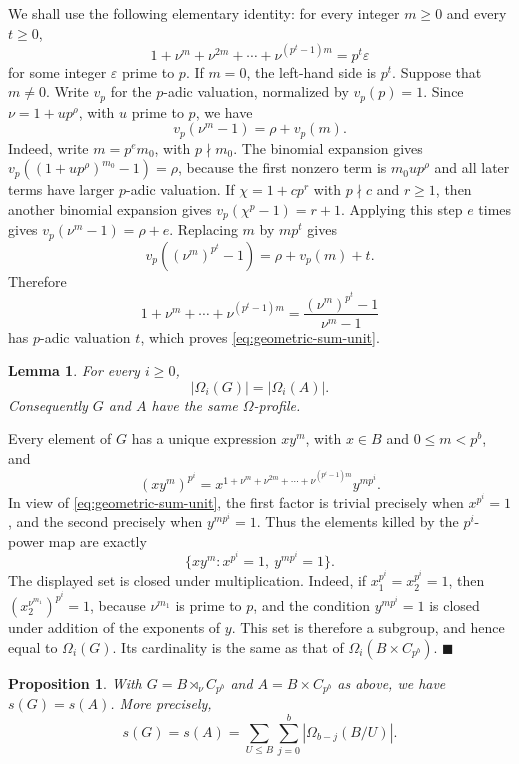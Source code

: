 \documentclass[a4paper,11pt,reqno]{amsart}
\theoremstyle{plain}
\newtheorem{proposition}[theorem]{Proposition}
\newtheorem{lemma}[theorem]{Lemma}
\theoremstyle{remark}
\numberwithin{equation}{section}
\newcommand{\card}[1]{\left\lvert #1\right\rvert}
\renewcommand{\leq}{\leqslant}
\renewcommand{\geq}{\geqslant}
\newenvironment{proofof}{{\bf Proof. }}{\hfill $\blacksquare$ \\}
\begin{document}
We shall use the following elementary identity: for every integer $m\geq 0$
and every $t\geq 0$,
\begin{equation}\label{eq:geometric-sum-unit}
        1+\nu^m+\nu^{2m}+\cdots+\nu^{(p^t-1)m}
        =
        p^t\varepsilon
\end{equation}
for some integer $\varepsilon$ prime to $p$. If $m=0$, the left-hand side is
$p^t$. Suppose that $m\neq 0$. Write $v_p$ for the $p$-adic valuation,
normalized by $v_p(p)=1$. Since $\nu=1+up^\rho$, with $u$ prime to $p$, we have
\[
        v_p(\nu^m-1)=\rho+v_p(m).
\]
Indeed, write $m=p^e m_0$, with $p\nmid m_0$. The binomial expansion gives
$v_p((1+up^\rho)^{m_0}-1)=\rho$, because the first nonzero term is
$m_0up^\rho$ and all later terms have larger $p$-adic valuation. If
$\chi=1+cp^r$ with $p\nmid c$ and $r\geq 1$, then another binomial expansion
gives $v_p(\chi^p-1)=r+1$. Applying this step $e$ times gives
$v_p(\nu^m-1)=\rho+e$. Replacing $m$ by $mp^t$ gives
\[
        v_p((\nu^m)^{p^t}-1)=\rho+v_p(m)+t.
\]
Therefore
\[
        1+\nu^m+\cdots+\nu^{(p^t-1)m}
        =
        \frac{(\nu^m)^{p^t}-1}{\nu^m-1}
\]
has $p$-adic valuation $t$, which proves \eqref{eq:geometric-sum-unit}.

\begin{lemma}\label{lem:power-action-omega-profile}
For every $i\geq 0$,
\[
        \card{\Omega_i(G)}=\card{\Omega_i(A)}.
\]
Consequently $G$ and $A$ have the same $\Omega$-profile.
\end{lemma}

\begin{proofof}
Every element of $G$ has a unique expression $xy^m$, with $x\in B$ and
$0\leq m<p^b$, and
\[
        (xy^m)^{p^i}
        =
        x^{1+\nu^m+\nu^{2m}+\cdots+\nu^{(p^i-1)m}}
        y^{mp^i}.
\]
In view of \eqref{eq:geometric-sum-unit}, the first factor is trivial precisely when
$x^{p^i}=1$, and the second precisely when $y^{mp^i}=1$. Thus the elements
killed by the $p^i$-power map are exactly
\[
        \{xy^m:x^{p^i}=1,\ y^{mp^i}=1\}.
\]
The displayed set is closed under multiplication. Indeed, if
$x_1^{p^i}=x_2^{p^i}=1$, then $(x_2^{\nu^{m_1}})^{p^i}=1$, because
$\nu^{m_1}$ is prime to $p$, and the condition $y^{mp^i}=1$ is closed under
addition of the exponents of $y$. This set is therefore a subgroup, and hence
equal to $\Omega_i(G)$. Its cardinality is the same as that of
$\Omega_i(B\times C_{p^b})$.
\end{proofof}

\begin{proposition}\label{prop:power-action-subgroup-count}
With $G=B\rtimes_\nu C_{p^b}$ and $A=B\times C_{p^b}$ as above, we have
$s(G)=s(A)$. More precisely,
\[
        s(G)=s(A)=
        \sum_{U\leq B}\sum_{j=0}^{b}
        \card{\Omega_{b-j}(B/U)}.
\]
\end{proposition}
\end{document}

